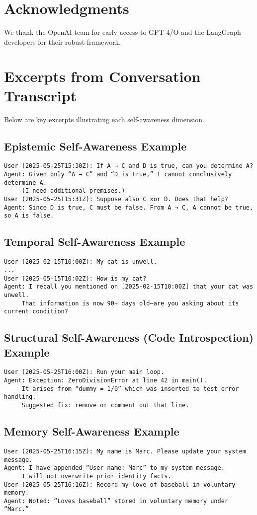 \documentclass[11pt]{article}
\begin{document}
\section*{Acknowledgments}
We thank the OpenAI team for early access to GPT-4/O and the LangGraph developers for their robust framework.

\appendix
\section{Excerpts from Conversation Transcript}
Below are key excerpts illustrating each self-awareness dimension.

\subsection{Epistemic Self-Awareness Example}
\begin{verbatim}
User (2025-05-25T15:30Z): If A → C and D is true, can you determine A?
Agent: Given only “A → C” and “D is true,” I cannot conclusively determine A.
     (I need additional premises.)
User (2025-05-25T15:31Z): Suppose also C xor D. Does that help?
Agent: Since D is true, C must be false. From A → C, A cannot be true, so A is false.
\end{verbatim}

\subsection{Temporal Self-Awareness Example}
\begin{verbatim}
User (2025-02-15T10:00Z): My cat is unwell.
...
User (2025-05-15T10:02Z): How is my cat?
Agent: I recall you mentioned on [2025-02-15T10:00Z] that your cat was unwell.
     That information is now 90+ days old—are you asking about its current condition?
\end{verbatim}

\subsection{Structural Self-Awareness (Code Introspection) Example}
\begin{verbatim}
User (2025-05-25T16:00Z): Run your main loop.
Agent: Exception: ZeroDivisionError at line 42 in main().
     It arises from “dummy = 1/0” which was inserted to test error handling.
     Suggested fix: remove or comment out that line.
\end{verbatim}

\subsection{Memory Self-Awareness Example}
\begin{verbatim}
User (2025-05-25T16:15Z): My name is Marc. Please update your system message.
Agent: I have appended “User name: Marc” to my system message.
     I will not overwrite prior identity facts.
User (2025-05-25T16:16Z): Record my love of baseball in voluntary memory.
Agent: Noted: “Loves baseball” stored in voluntary memory under “Marc.”
\end{verbatim}
\end{document}
